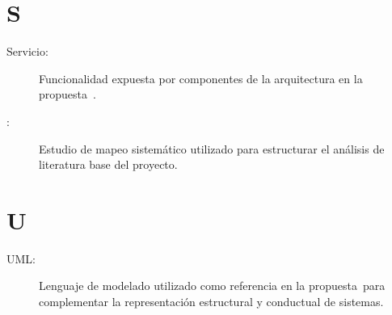 \section*{S}
\begin{description}
	\item[Servicio:] Funcionalidad expuesta por componentes de la arquitectura en la propuesta~\NDITI.

	\item[\SMS:] Estudio de mapeo sistemático utilizado para estructurar el análisis de literatura base del proyecto.
\end{description}

\section*{U}
\begin{description}
	\item[UML:] Lenguaje de modelado utilizado como referencia en la propuesta~\NDITI para complementar la representación estructural y conductual de sistemas.
\end{description}